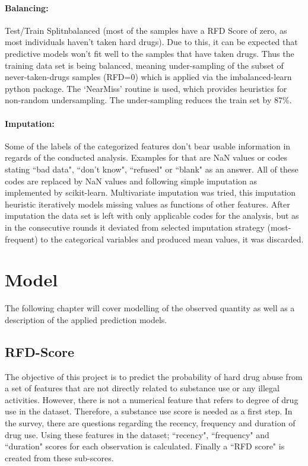 \documentclass[12pt]{article}
\begin{document}
\paragraph*{Balancing:}
Test/Train Splitnbalanced (most of the samples have a RFD Score of zero, as most individuals haven’t taken hard drugs). Due to this, it can be expected that predictive models won’t fit well to the samples that have taken drugs. Thus the training data set is being balanced, meaning under-sampling of the subset of never-taken-drugs samples (RFD=0) which is applied via the imbalanced-learn python package. The ‘NearMiss’ routine is used, which provides heuristics for non-random undersampling. The under-sampling reduces the train set by 87\%.


\paragraph*{Imputation:}
Some of the labels of the categorized features don’t bear usable information in regards of the conducted analysis. Examples for that are NaN values or codes stating ``bad data", ``don’t know", ``refused" or ``blank" as an answer. All of these codes are replaced by NaN values and following simple imputation as implemented by scikit-learn. 
Multivariate imputation was tried, this imputation heuristic iteratively models missing values as functions of other features. After imputation the data set is left with only applicable codes for the analysis, but as in the consecutive rounds it deviated from selected imputation strategy (most-frequent) to the categorical variables and produced mean values, it was discarded.

%
%

\newpage
\section{Model}
The following chapter will cover modelling of the observed quantity as well as a description of the applied prediction models.

\subsection{RFD-Score}
The objective of this project is to predict the probability of hard drug abuse from a set of features that are not directly related to substance use or any illegal activities. However, there is not a numerical feature that refers to degree of drug use in the dataset. Therefore, a substance use score is needed as a first step. In the survey, there are questions regarding the recency, frequency and duration of drug use. Using these features in the dataset; ``recency", ``frequency" and ``duration" scores for each observation is calculated. Finally a ``RFD score" is created from these sub-scores. 
\end{document}
